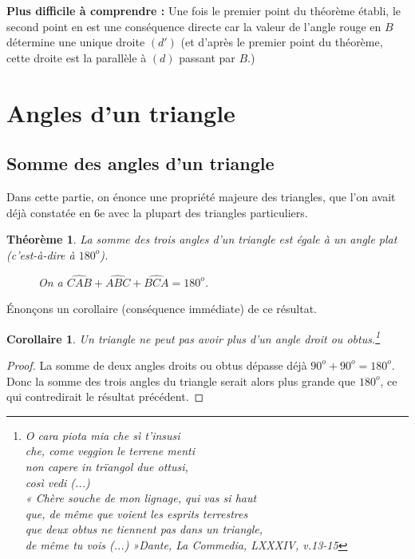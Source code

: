 \documentclass[12 pt]{article}
\theoremstyle{plain}
\newcounter{n}
\numberwithin{n}{section}
\newtheorem{theo}{Théorème}
\newtheorem*{cor}{Corollaire}
\begin{document}
\textbf{Plus difficile à comprendre : } Une fois le premier point du théorème établi, le second point en est une conséquence directe car la valeur 
de l'angle rouge en $B$ détermine une unique droite $(d')$ (et d'après le premier point du théorème, cette droite est
la parallèle à $(d)$ passant par $B$.)


\section{Angles d'un triangle}
\subsection{Somme des angles d'un triangle}
Dans cette partie, on énonce une propriété majeure des triangles, que l'on avait déjà constatée en 6e avec la plupart des triangles particuliers. 
\begin{theo}
La somme des trois angles d'un triangle est égale à un angle plat (c'est-à-dire à $180^o$). 

\begin{figure}[H]\center
{} \caption{On a $\widehat{CAB}+\widehat{ABC}+\widehat{BCA}= 180^o$.}
\end{figure}
\end{theo}

Énonçons un corollaire (conséquence immédiate) de ce résultat. 
\begin{cor}
Un triangle ne peut pas avoir plus d'un angle droit ou obtus.\footnote{
O cara piota mia che sì t'insusi\\ 
che, come veggion le terrene menti \\
non capere in trïangol due ottusi, \\ 
così vedi (...)\\

« Chère souche de mon lignage, qui vas si haut \\ 
que, de même que voient les esprits terrestres\\
que deux 
obtus ne tiennent pas dans un triangle, \\ 
de même tu vois (...) »\flushright Dante, La Commedia, LXXXIV, v.13-15
}
\end{cor}
\begin{proof}
La somme de deux angles droits ou obtus dépasse déjà $90^o+90^o=180^o.$ Donc la somme des trois angles 
du triangle serait alors plus grande que $180^o$, ce qui contredirait le résultat précédent.  
\end{proof}
\end{document}
